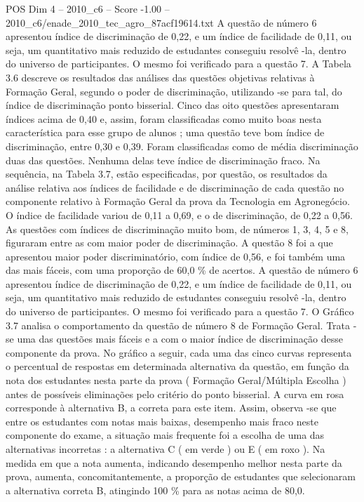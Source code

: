 \begin{textsample}{POS Dim 4 – 2010\_c6 – Score -1.00 – 2010\_c6/enade\_2010\_tec\_agro\_87acf19614.txt}
A questão de número 6 apresentou índice de discriminação de 0,22, e um índice de facilidade de 0,11, ou seja, um quantitativo mais reduzido de estudantes conseguiu resolvê -la, dentro do universo de participantes.
O mesmo foi verificado para a questão 7.
A Tabela 3.6 descreve os resultados das análises das questões objetivas relativas à Formação Geral, segundo o poder de discriminação, utilizando -se para tal, do índice de discriminação ponto bisserial.
Cinco das oito questões apresentaram índices acima de 0,40 e, assim, foram classificadas como muito boas nesta característica para esse grupo de alunos ; uma questão teve bom índice de discriminação, entre 0,30 e 0,39.
Foram classificadas como de média discriminação duas das questões.
Nenhuma delas teve índice de discriminação fraco.
Na sequência, na Tabela 3.7, estão especificadas, por questão, os resultados da análise relativa aos índices de facilidade e de discriminação de cada questão no componente relativo à Formação Geral da prova da Tecnologia em Agronegócio.
O índice de facilidade variou de 0,11 a 0,69, e o de discriminação, de 0,22 a 0,56.
As questões com índices de discriminação muito bom, de números 1, 3, 4, 5 e 8, figuraram entre as com maior poder de discriminação.
A questão 8 foi a que apresentou maior poder discriminatório, com índice de 0,56, e foi também uma das mais fáceis, com uma proporção de 60,0 \% de acertos.
A questão de número 6 apresentou índice de discriminação de 0,22, e um índice de facilidade de 0,11, ou seja, um quantitativo mais reduzido de estudantes conseguiu resolvê -la, dentro do universo de participantes.
O mesmo foi verificado para a questão 7.
O Gráfico 3.7 analisa o comportamento da questão de número 8 de Formação Geral.
Trata -se uma das questões mais fáceis e a com o maior índice de discriminação desse componente da prova.
No gráfico a seguir, cada uma das cinco curvas representa o percentual de respostas em determinada alternativa da questão, em função da nota dos estudantes nesta parte da prova ( Formação Geral/Múltipla Escolha ) antes de possíveis eliminações pelo critério do ponto bisserial.
A curva em rosa corresponde à alternativa B, a correta para este item.
Assim, observa -se que entre os estudantes com notas mais baixas, desempenho mais fraco neste componente do exame, a situação mais frequente foi a escolha de uma das alternativas incorretas : a alternativa C ( em verde ) ou E ( em roxo ).
Na medida em que a nota aumenta, indicando desempenho melhor nesta parte da prova, aumenta, concomitantemente, a proporção de estudantes que selecionaram a alternativa correta B, atingindo 100 \% para as notas acima de 80,0.

\end{textsample}
